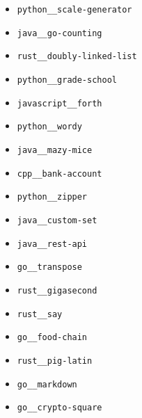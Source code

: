 \begin{multicols}{2}
\begin{itemize}
    \item \texttt{python\_\_scale-generator}
    \item \texttt{java\_\_go-counting}
    \item \texttt{rust\_\_doubly-linked-list}
    \item \texttt{python\_\_grade-school}
    \item \texttt{javascript\_\_forth}
    \item \texttt{python\_\_wordy}
    \item \texttt{java\_\_mazy-mice}
    \item \texttt{cpp\_\_bank-account}
    \item \texttt{python\_\_zipper}
    \item \texttt{java\_\_custom-set}
    \item \texttt{java\_\_rest-api}
    \item \texttt{go\_\_transpose}
    \item \texttt{rust\_\_gigasecond}
    \item \texttt{rust\_\_say}
    \item \texttt{go\_\_food-chain}
    \item \texttt{rust\_\_pig-latin}
    \item \texttt{go\_\_markdown}
    \item \texttt{go\_\_crypto-square}
\end{itemize}
\end{multicols}